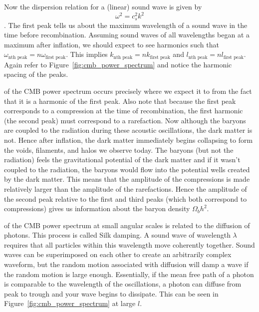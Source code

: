 Now the dispersion relation for a (linear) sound wave is given by
\begin{dmath}
    \omega^2 = c_s^2k^2
\end{dmath}.
The first peak tells us about the maximum wavelength of a sound wave in the time before
recombination.  Assuming sound waves of all wavelengths began at a maximum after inflation,
we should expect to see harmonics such that $\omega_{\text{nth peak}} = n\omega_{\text{first peak}}$.
This implies $k_{\text{nth peak}} = nk_{\text{first peak}}$ and
$l_{\text{nth peak}} = nl_{\text{first peak}}$.  Again refer to Figure~\ref{fig:cmb_power_spectrum}
and notice the harmonic spacing of the peaks.

 of the CMB power spectrum occurs precisely where we expect it to
from the fact that it is a harmonic of the first peak.  Also note that because the first
peak corresponds to a compression at the time of recombination, the first harmonic (the second peak)
must correspond to a rarefaction.  Now although the baryons are coupled to the radiation during these acoustic oscillations,
the dark matter is not.  Hence after inflation, the dark matter immediately begins collapsing
to form the voids, filaments, and halos we observe today.  The baryons (but not the radiation)
feels the gravitational potential of the dark matter and if it wasn't coupled to the radiation,
the baryons would flow into the potential wells created by the dark matter.  This means that
the amplitude of the compressions is made relatively larger than the amplitude of the rarefactions.
Hence the amplitude of the second peak relative to the first and third peaks (which both correspond
to compressions) gives us information about the baryon density $\Omega_bh^2$.

 of the CMB power spectrum at small angular scales is related to the diffusion of photons.  This process is called Silk damping.
A sound wave of wavelength $\lambda$ requires that all particles within this
wavelength move coherently together.  Sound waves can be superimposed on each other to create
an arbitrarily complex waveform, but the random motion associated with diffusion will damp a wave
if the random motion is large enough.  Essentially, if the mean free path of a photon is comparable
to the wavelength of the oscillations, a photon can diffuse from peak to trough and your wave
begins to dissipate.  This can be seen in Figure~\ref{fig:cmb_power_spectrum} at large $l$.

